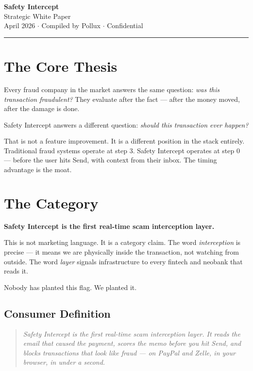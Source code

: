\documentclass[12pt, letterpaper]{article}
\begin{document}
\begin{center}
  {\LARGE\bfseries Safety Intercept}\\[0.4em]
  {\large\color{muted} Strategic White Paper}\\[0.6em]
  {\small\color{muted} April 2026 $\cdot$ Compiled by Pollux $\cdot$ Confidential}
\end{center}

\vspace{1.2em}
\textcolor{accent}{\rule{\linewidth}{1pt}}
\vspace{1.2em}

\section{The Core Thesis}

Every fraud company in the market answers the same question: \textit{was this transaction fraudulent?} They evaluate after the fact --- after the money moved, after the damage is done.

Safety Intercept answers a different question: \textit{should this transaction ever happen?}

That is not a feature improvement. It is a different position in the stack entirely. Traditional fraud systems operate at step 3. Safety Intercept operates at step 0 --- before the user hits Send, with context from their inbox. The timing advantage is the moat.

\section{The Category}

\textbf{Safety Intercept is the first real-time scam interception layer.}

This is not marketing language. It is a category claim. The word \textit{interception} is precise --- it means we are physically inside the transaction, not watching from outside. The word \textit{layer} signals infrastructure to every fintech and neobank that reads it.

Nobody has planted this flag. We planted it.

\subsection{Consumer Definition}

\begin{quote}
\textit{Safety Intercept is the first real-time scam interception layer. It reads the email that caused the payment, scores the memo before you hit Send, and blocks transactions that look like fraud --- on PayPal and Zelle, in your browser, in under a second.}
\end{quote}
\end{document}
